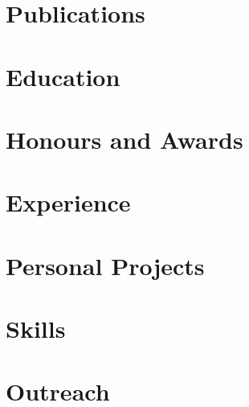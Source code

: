 \documentclass[english,a4paper,10pt]{extarticle}
\begin{document}
\def\role{} %

\pagestyle{normal_page}
\thispagestyle{first_page}



\section{Publications}


\section{Education}


\section{Honours and Awards}


\section{Experience}


\section{Personal Projects}


\section{Skills}


\section{Outreach}


\thispagestyle{last_page}

\end{document}
